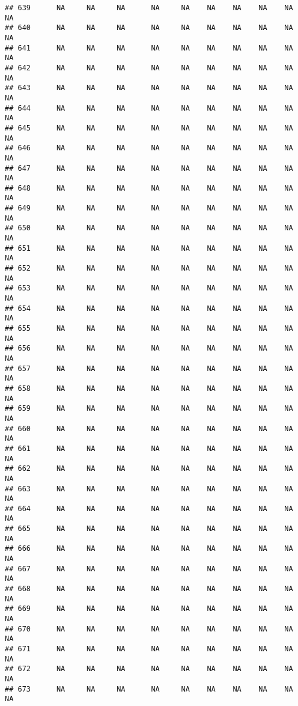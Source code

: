 \documentclass{article}\usepackage{graphicx, color}
\makeatletter
\newenvironment{kframe}{%
 \def\at@end@of@kframe{}%
 \ifinner\ifhmode%
  \def\at@end@of@kframe{\end{minipage}}%
  \begin{minipage}{\columnwidth}%
 \fi\fi%
 \def\FrameCommand##1{\hskip\@totalleftmargin \hskip-\fboxsep
 \colorbox{shadecolor}{##1}\hskip-\fboxsep
     \hskip-\linewidth \hskip-\@totalleftmargin \hskip\columnwidth}%
 \MakeFramed {\advance\hsize-\width
   \@totalleftmargin\z@ \linewidth\hsize
   \@setminipage}}%
 {\par\unskip\endMakeFramed%
 \at@end@of@kframe}
\newenvironment{knitrout}{}{} %
\makeatother
\begin{document}
\begin{knitrout}
\begin{kframe}
\begin{verbatim}
## 639      NA     NA     NA      NA     NA    NA    NA    NA    NA     NA
## 640      NA     NA     NA      NA     NA    NA    NA    NA    NA     NA
## 641      NA     NA     NA      NA     NA    NA    NA    NA    NA     NA
## 642      NA     NA     NA      NA     NA    NA    NA    NA    NA     NA
## 643      NA     NA     NA      NA     NA    NA    NA    NA    NA     NA
## 644      NA     NA     NA      NA     NA    NA    NA    NA    NA     NA
## 645      NA     NA     NA      NA     NA    NA    NA    NA    NA     NA
## 646      NA     NA     NA      NA     NA    NA    NA    NA    NA     NA
## 647      NA     NA     NA      NA     NA    NA    NA    NA    NA     NA
## 648      NA     NA     NA      NA     NA    NA    NA    NA    NA     NA
## 649      NA     NA     NA      NA     NA    NA    NA    NA    NA     NA
## 650      NA     NA     NA      NA     NA    NA    NA    NA    NA     NA
## 651      NA     NA     NA      NA     NA    NA    NA    NA    NA     NA
## 652      NA     NA     NA      NA     NA    NA    NA    NA    NA     NA
## 653      NA     NA     NA      NA     NA    NA    NA    NA    NA     NA
## 654      NA     NA     NA      NA     NA    NA    NA    NA    NA     NA
## 655      NA     NA     NA      NA     NA    NA    NA    NA    NA     NA
## 656      NA     NA     NA      NA     NA    NA    NA    NA    NA     NA
## 657      NA     NA     NA      NA     NA    NA    NA    NA    NA     NA
## 658      NA     NA     NA      NA     NA    NA    NA    NA    NA     NA
## 659      NA     NA     NA      NA     NA    NA    NA    NA    NA     NA
## 660      NA     NA     NA      NA     NA    NA    NA    NA    NA     NA
## 661      NA     NA     NA      NA     NA    NA    NA    NA    NA     NA
## 662      NA     NA     NA      NA     NA    NA    NA    NA    NA     NA
## 663      NA     NA     NA      NA     NA    NA    NA    NA    NA     NA
## 664      NA     NA     NA      NA     NA    NA    NA    NA    NA     NA
## 665      NA     NA     NA      NA     NA    NA    NA    NA    NA     NA
## 666      NA     NA     NA      NA     NA    NA    NA    NA    NA     NA
## 667      NA     NA     NA      NA     NA    NA    NA    NA    NA     NA
## 668      NA     NA     NA      NA     NA    NA    NA    NA    NA     NA
## 669      NA     NA     NA      NA     NA    NA    NA    NA    NA     NA
## 670      NA     NA     NA      NA     NA    NA    NA    NA    NA     NA
## 671      NA     NA     NA      NA     NA    NA    NA    NA    NA     NA
## 672      NA     NA     NA      NA     NA    NA    NA    NA    NA     NA
## 673      NA     NA     NA      NA     NA    NA    NA    NA    NA     NA

\end{verbatim}
\end{kframe}
\end{knitrout}
\end{document}
